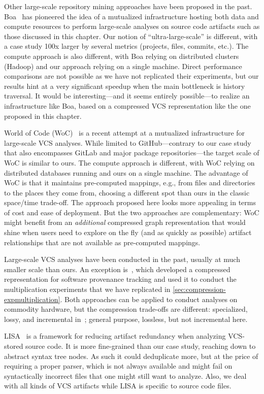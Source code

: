 Other large-scale repository mining approaches have been proposed in the past.
%
Boa~\cite{dyer2013boa} has pioneered the idea of a mutualized infrastructure
hosting both data and compute resources to perform large-scale analyses on
source code artifacts such as those discussed in this chapter. Our notion of
``ultra-large-scale'' is different, with a case study 100x larger by several
metrics (projects, files, commits, etc.). The compute approach is also
different, with Boa relying on distributed clusters (Hadoop) and our approach
relying on a single machine. Direct performance comparisons are not possible as
we have not replicated their experiments, but our results hint at a very
significant speedup when the main bottleneck is history traversal. It would be
interesting---and it seems entirely possible---to realize an infrastructure
like Boa, based on a compressed VCS representation like the one proposed in
this chapter.

World of Code (WoC)~\cite{mockus2019woc} is a recent attempt at a mutualized
infrastructure for large-scale VCS analyses. While limited to GitHub---contrary
to our case study that also encompasses GitLab and major package
repositories---the target scale of WoC is similar to ours. The compute approach
is different, with WoC relying on distributed databases running and ours on a
single machine. The advantage of WoC is that it maintains pre-computed
mappings, e.g., from files and directories to the places they come from,
choosing a different spot than ours in the classic space/time trade-off. The
approach proposed here looks more appealing in terms of cost and ease of
deployment. But the two approaches are complementary: WoC might benefit from an
\emph{additional} compressed graph representation that would shine when users
need to explore on the fly (and as quickly as possible) artifact relationships
that are not available as pre-computed mappings.

Large-scale VCS analyses have been conducted in the past, usually at much
smaller scale than ours. An exception is~\cite{swh-provenance-tr}, which
developed a compressed representation for software provenance tracking and used
it to conduct the multiplication experiments that we have replicated in
\cref{sec:compression-expmultiplication}. Both approaches can be applied
to conduct analyses on commodity hardware, but the compression trade-offs are
different: specialized, lossy, and incremental in~\cite{swh-provenance-tr};
general purpose, lossless, but not incremental here.

LISA~\cite{alexandru2019redundancy} is a framework for reducing artifact
redundancy when analyzing VCS-stored source code. It is more fine-grained than
our case study, reaching down to abstract syntax tree nodes. As such it could
deduplicate more, but at the price of requiring a proper parser, which is not
always available and might fail on syntactically incorrect files that one might
still want to analyze. Also, we deal with all kinds of VCS artifacts while LISA
is specific to source code files.

